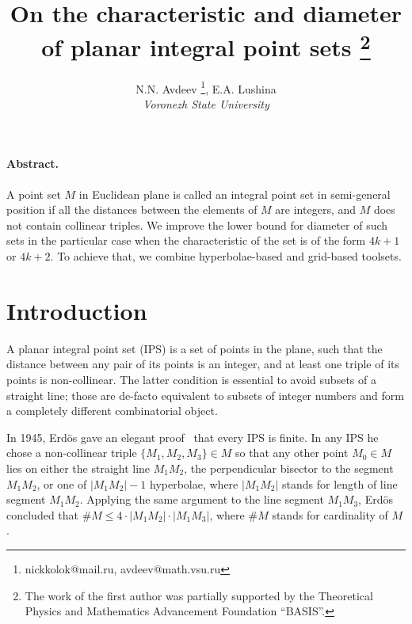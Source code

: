 \documentclass[a4paper,14pt]{article} %
\theoremstyle{plain}
\theoremstyle{definition}
\begin{document}

\title{
	On the characteristic and diameter of planar integral point sets
	\footnote{
		The work of the first author was partially supported by the Theoretical Physics
		and Mathematics Advancement Foundation “BASIS”.
	}
}

\author{
	N.N. Avdeev
	\footnote{nickkolok@mail.ru, avdeev@math.vsu.ru},
	E.A. Lushina
	\\
	\textit{Voronezh State University}
}


\maketitle

\paragraph{Abstract.}
A point set $M$ in Euclidean plane is called an integral point set in semi-general position if all the distances between the
elements of $M$ are integers, and $M$ does not contain collinear triples.
We improve the lower bound for diameter of such sets in the particular case
when the characteristic of the set is of the form $4k+1$ or $4k+2$.
To achieve that, we combine hyperbolae-based and grid-based toolsets.


\section{Introduction}
	A planar integral point set (IPS) is a set of points in the plane, such that the distance between any pair of its points is an integer, and at least one triple of its points is non-collinear. The latter condition is essential to avoid subsets of a straight line; those are de-facto equivalent to subsets of integer numbers and form a completely different combinatorial object.

	In 1945, Erdös gave an elegant proof~\cite{anning1945integral,erdos1945integral} that every IPS is finite.
	In any IPS he chose a non-collinear triple $\{M_1, M_2, M_3\} \in M$ so that any other point $M_0 \in M$ lies on either the straight line $M_1M_2$, the perpendicular bisector to the segment $M_1M_2$, or one of $|M_1M_2|-1$ hyperbolae, where $|M_1M_2|$ stands for length of line segment $M_1M_2$.  Applying the same argument to the line segment $M_1M_3$, Erdös concluded that $\#M \le 4 \cdot |M_1M_2| \cdot |M_1M_3|$, where $\#M$ stands for cardinality of $M$.
\end{document}
